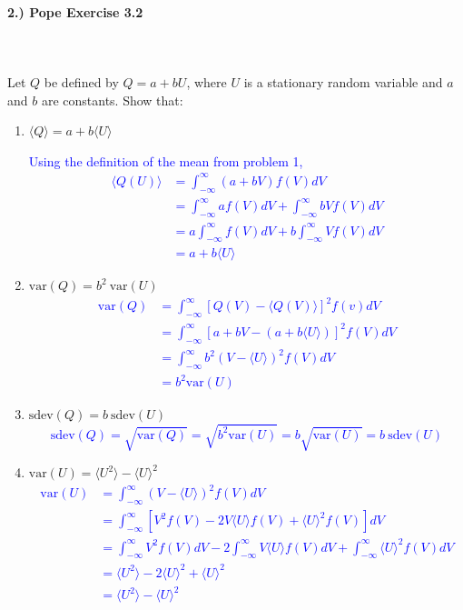 \documentclass[11pt]{article}
\begin{document}
\paragraph{2.) Pope Exercise 3.2}~\\\\
Let $Q$ be defined by $Q = a + bU$, where $U$ is a stationary random variable and $a$ and $b$ are constants. Show that:
\begin{enumerate}[label=(\alph*),topsep=-10pt]
	\item $\langle Q \rangle = a + b\langle U \rangle$
	
	\textcolor{blue}{Using the definition of the mean from problem 1,
	\begin{align*}
	\langle Q(U) \rangle &= \int^{\infty}_{-\infty} (a + bV) f(V) dV\\
	&= \int^{\infty}_{-\infty} a f(V) dV + \int^{\infty}_{-\infty} bV f(V) dV\\ 
	&= a\int^{\infty}_{-\infty}f(V) dV + b\int^{\infty}_{-\infty} V f(V) dV\\ 
	&= a + b\langle U \rangle
	\end{align*}}
	\item $\text{var}(Q) = b^2\ \text{var}(U)$
	\textcolor{blue}{
	\begin{align*}
	\text{var}(Q) &= \int^{\infty}_{-\infty} [Q(V) - \langle Q(V)\rangle]^2 f(v) dV\\
		&= \int^{\infty}_{-\infty} [a + bV - (a + b\langle U \rangle)]^2f(V)dV\\
		&= \int^{\infty}_{-\infty} b^2 (V - \langle U \rangle)^2 f(V)dV\\
		&= b^2 \text{var}(U)
	\end{align*}}
	\item $\text{sdev}(Q) = b\ \text{sdev}(U)$
	\textcolor{blue}{
	$$\text{sdev}(Q) = \sqrt{ \text{var}(Q)} = \sqrt{b^2\text{var}(U)} = b\sqrt{\text{var}(U)} = b\ \text{sdev}(U)$$}
	\item $\text{var}(U) = \langle U^2 \rangle - {\langle U \rangle}^2$
	\textcolor{blue}{
	\begin{align*}
	\text{var}(U) &= \int^{\infty}_{-\infty} (V - \langle U \rangle)^2f(V)dV\\
	&= \int^{\infty}_{-\infty}[V^2 f(V) - 2V\langle U \rangle f(V) + \langle U \rangle^2 f(V)]dV\\
	&= \int^{\infty}_{-\infty} V^2 f(V)dV -2 \int^{\infty}_{-\infty} V\langle U \rangle f(V) dV + \int^{\infty}_{-\infty} \langle U \rangle^2 f(V) dV\\
	&= \langle U^2 \rangle - 2\langle U \rangle^2  + \langle U \rangle^2\\
	&= \langle U^2 \rangle - \langle U \rangle^2
	\end{align*}}

\end{enumerate}
\end{document}
